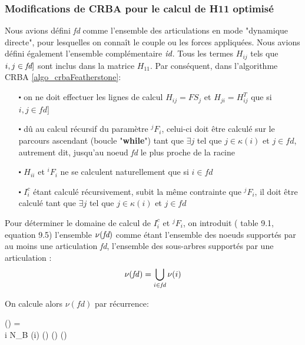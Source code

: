 \documentclass{report}
\begin{document}
\subsubsection{Modifications de CRBA pour le calcul de H11 optimisé}

Nous avions défini \emph{fd} comme l'ensemble des articulations en mode "dynamique directe", \cad pour lesquelles on connaît le couple ou les forces appliquées. Nous avions défini également l'ensemble complémentaire $\emph{id}$. Tous les termes $H_{ij}$ tels que $i,j \in \emph{fd}]$ sont inclus dans la matrice $H_{11}$. Par conséquent, dans l'algorithme CRBA \ref{algo_crbaFeatherstone}: \\
\begin{itemize}
\item[$\centerdot$] on ne doit effectuer les lignes de calcul $H_{ij} = F S_j$ et $H_{ji} = H_{ij}^T$ que si $i,j \in \mathit{fd}]$
\item[$\centerdot$] dû au calcul récursif du paramètre $^jF_i$, celui-ci doit être calculé sur le parcours ascendant (boucle "\textbf{while}") tant que $\exists j$ tel que $j \in \kappa(i)$ et $j \in \mathit{fd}$, autrement dit, jusqu'au noeud \emph{fd} le plus proche de la racine\footnotemark[1]
\item[$\centerdot$] $H_{ii}$ et $^iF_i$ ne se calculent naturellement que si $i \in \mathit{fd}$
\item[$\centerdot$] $I_i^c$ étant calculé récursivement, subit la même contrainte que $^jF_i$, il doit être calculé tant que $\exists j$ tel que $j \in \kappa(i)$ et $j \in \mathit{fd}$\footnotemark[1]
\end{itemize}

\medskip
Pour déterminer le domaine de calcul de $I_i^c$ et $^jF_i$, on introduit (\cite{bib_featherstone} table 9.1, equation 9.5) l'ensemble $\nu(\emph{fd})$ comme étant l'ensemble des noeuds supportés par au moins une articulation \emph{fd}, \cad l'ensemble des sous-arbres supportés par une articulation \fd:
\begin{equation}
\nu(\mathit{fd}) = \bigcup_{i \in \mathit{fd}}\nu(i)
\end{equation}

\begin{minipage}[c]{0.5\textwidth}
\end{minipage}
\begin{minipage}[c]{0.5\textwidth}
    On calcule alors $\nu(fd)$ par récurrence:
    \begin{spacing}{1.5}
	  \begin{pseudocode}[display]{}{}
    \nu(\mfd) = \mfd \\
		\FOR i  \TO N_B \DO
		\BEGIN
		  \IF \lambda(i) \in \nu(\mfd)
		  \THEN
		    \nu(\mfd) \GETS \nu(\mfd) 
		\END
    \end{pseudocode}
    \end{spacing}
\end{minipage}
\end{document}
